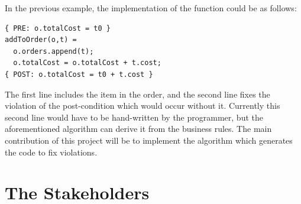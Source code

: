 \documentclass[12pt]{report}
\begin{document}
In the previous example, the implementation of the
function could be as follows: 

\begin{verbatim}
{ PRE: o.totalCost = t0 } 
addToOrder(o,t) = 
  o.orders.append(t);
  o.totalCost = o.totalCost + t.cost;
{ POST: o.totalCost = t0 + t.cost } 
\end{verbatim}
The first line includes the item in the order, and the second line fixes the
violation of the post-condition which would occur without it. Currently this
second line would have to be hand-written by the programmer, but the
aforementioned
 algorithm can derive it from the business rules. The main
contribution of this project will be to implement the algorithm which generates
the code to fix violations.


\section{The Stakeholders}\label{sec:Stakeholders}

\end{document}
